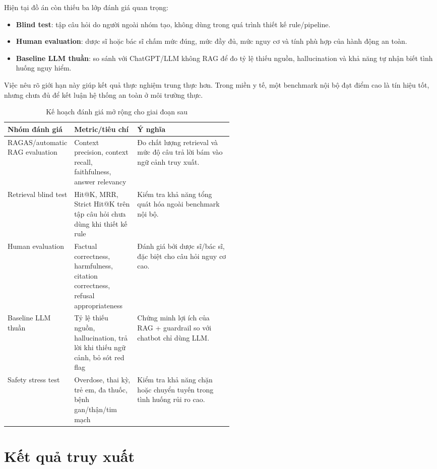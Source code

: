 Hiện tại đồ án còn thiếu ba lớp đánh giá quan trọng:

\begin{itemize}
  \item \textbf{Blind test}: tập câu hỏi do người ngoài nhóm tạo, không dùng trong quá trình thiết kế rule/pipeline.
  \item \textbf{Human evaluation}: dược sĩ hoặc bác sĩ chấm mức đúng, mức đầy đủ, mức nguy cơ và tính phù hợp của hành động an toàn.
  \item \textbf{Baseline LLM thuần}: so sánh với ChatGPT/LLM không RAG để đo tỷ lệ thiếu nguồn, hallucination và khả năng tự nhận biết tình huống nguy hiểm.
\end{itemize}

Việc nêu rõ giới hạn này giúp kết quả thực nghiệm trung thực hơn. Trong miền y tế, một benchmark nội bộ đạt điểm cao là tín hiệu tốt, nhưng chưa đủ để kết luận hệ thống an toàn ở môi trường thực.

\begin{table}[H]
\centering
\small
\caption{Kế hoạch đánh giá mở rộng cho giai đoạn sau}
\begin{tabularx}{\linewidth}{L{0.24\linewidth} L{0.28\linewidth} Y}
\toprule
\textbf{Nhóm đánh giá} & \textbf{Metric/tiêu chí} & \textbf{Ý nghĩa} \\
\midrule
RAGAS/automatic RAG evaluation & Context precision, context recall, faithfulness, answer relevancy & Đo chất lượng retrieval và mức độ câu trả lời bám vào ngữ cảnh truy xuất. \\
Retrieval blind test & Hit@K, MRR, Strict Hit@K trên tập câu hỏi chưa dùng khi thiết kế rule & Kiểm tra khả năng tổng quát hóa ngoài benchmark nội bộ. \\
Human evaluation & Factual correctness, harmfulness, citation correctness, refusal appropriateness & Đánh giá bởi dược sĩ/bác sĩ, đặc biệt cho câu hỏi nguy cơ cao. \\
Baseline LLM thuần & Tỷ lệ thiếu nguồn, hallucination, trả lời khi thiếu ngữ cảnh, bỏ sót red flag & Chứng minh lợi ích của RAG + guardrail so với chatbot chỉ dùng LLM. \\
Safety stress test & Overdose, thai kỳ, trẻ em, đa thuốc, bệnh gan/thận/tim mạch & Kiểm tra khả năng chặn hoặc chuyển tuyến trong tình huống rủi ro cao. \\
\bottomrule
\end{tabularx}
\end{table}

\section{Kết quả truy xuất}

